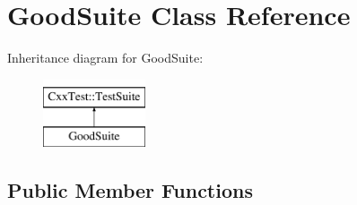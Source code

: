 \hypertarget{classGoodSuite}{\section{Good\-Suite Class Reference}
\label{classGoodSuite}
}
Inheritance diagram for Good\-Suite\-:\begin{figure}[H]
\begin{center}
\leavevmode
\includegraphics[height=2.000000cm]{classGoodSuite}
\end{center}
\end{figure}
\subsection*{Public Member Functions}
